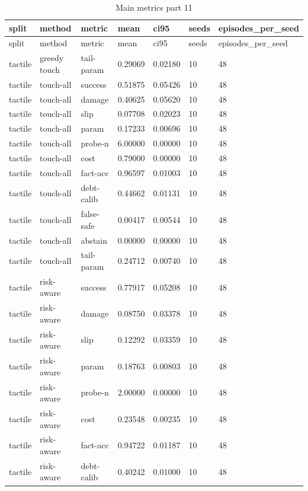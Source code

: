 \documentclass{article}
\begin{document}
\begin{center}
\tiny
\renewcommand{\arraystretch}{0.92}
\setlength{\tabcolsep}{3pt}
\begin{longtable}{lllllll}
\caption{Main metrics part 11}\label{tab:main-metrics-11}\\
\toprule
split & method & metric & mean & ci95 & seeds & episodes\_per\_seed \\
\midrule
\endfirsthead
\toprule
split & method & metric & mean & ci95 & seeds & episodes\_per\_seed \\
\midrule
\endhead
tactile & greedy touch & tail-param & 0.29069 & 0.02180 & 10 & 48 \\
tactile & touch-all & success & 0.51875 & 0.05426 & 10 & 48 \\
tactile & touch-all & damage & 0.40625 & 0.05620 & 10 & 48 \\
tactile & touch-all & slip & 0.07708 & 0.02023 & 10 & 48 \\
tactile & touch-all & param & 0.17233 & 0.00696 & 10 & 48 \\
tactile & touch-all & probe-n & 6.00000 & 0.00000 & 10 & 48 \\
tactile & touch-all & cost & 0.79000 & 0.00000 & 10 & 48 \\
tactile & touch-all & fact-acc & 0.96597 & 0.01003 & 10 & 48 \\
tactile & touch-all & debt-calib & 0.44662 & 0.01131 & 10 & 48 \\
tactile & touch-all & false-safe & 0.00417 & 0.00544 & 10 & 48 \\
tactile & touch-all & abstain & 0.00000 & 0.00000 & 10 & 48 \\
tactile & touch-all & tail-param & 0.24712 & 0.00740 & 10 & 48 \\
tactile & risk-aware & success & 0.77917 & 0.05208 & 10 & 48 \\
tactile & risk-aware & damage & 0.08750 & 0.03378 & 10 & 48 \\
tactile & risk-aware & slip & 0.12292 & 0.03359 & 10 & 48 \\
tactile & risk-aware & param & 0.18763 & 0.00803 & 10 & 48 \\
tactile & risk-aware & probe-n & 2.00000 & 0.00000 & 10 & 48 \\
tactile & risk-aware & cost & 0.23548 & 0.00235 & 10 & 48 \\
tactile & risk-aware & fact-acc & 0.94722 & 0.01187 & 10 & 48 \\
tactile & risk-aware & debt-calib & 0.40242 & 0.01000 & 10 & 48 \\

\end{longtable}
\end{center}
\end{document}
